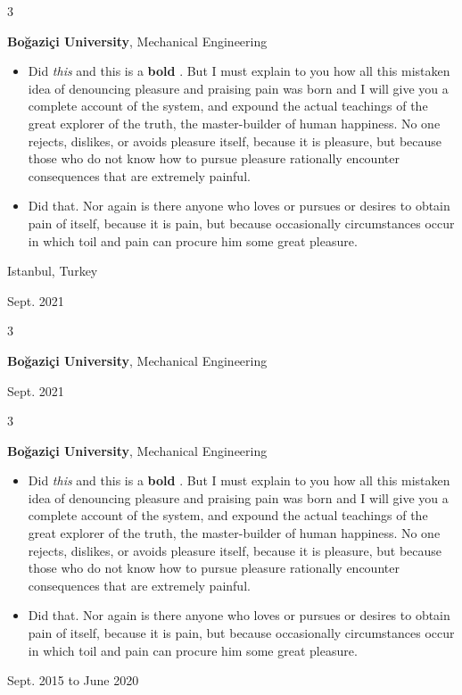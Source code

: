 \documentclass[10pt, letterpaper]{article}
\newenvironment{highlights}{
    \begin{itemize}[
        topsep=0.10 cm,
        parsep=0.10 cm,
        partopsep=0pt,
        itemsep=0pt,
        leftmargin=0.4 cm + 10pt
    ]
}{
    \end{itemize}
} %
\newenvironment{threecolentry}[3][]{
    \onecolentry
    \def\thirdColumn{#3}
    \setcolumnwidth{1 cm, \fill, 4.5 cm}
    \begin{paracol}{3}
    {\raggedright #2} \switchcolumn
}{
    \switchcolumn \raggedleft \thirdColumn
    \end{paracol}
    \endonecolentry
} %
\let\hrefWithoutArrow\href
\renewcommand{\href}[2]{\hrefWithoutArrow{#1}{\mbox{\ifthenelse{\equal{#2}{}}{ }{#2 }\raisebox{.15ex}{\footnotesize \faExternalLink*}}}}
\begin{document}
        \vspace{0.2 cm}

        \begin{threecolentry}{\textbf{}}{
            Istanbul, Turkey

        Sept. 2021
        }
            \textbf{Boğaziçi University}, Mechanical Engineering
            \begin{highlights}
                \item Did \textit{this} and this is a \textbf{bold} \href{https://example.com}{link}. But I must explain to you how all this mistaken idea of denouncing pleasure and praising pain was born and I will give you a complete account of the system, and expound the actual teachings of the great explorer of the truth, the master-builder of human happiness. No one rejects, dislikes, or avoids pleasure itself, because it is pleasure, but because those who do not know how to pursue pleasure rationally encounter consequences that are extremely painful.
                \item Did that. Nor again is there anyone who loves or pursues or desires to obtain pain of itself, because it is pain, but because occasionally circumstances occur in which toil and pain can procure him some great pleasure.
            \end{highlights}
        \end{threecolentry}

        \vspace{0.2 cm}

        \begin{threecolentry}{\textbf{}}{
            Sept. 2021
        }
            \textbf{Boğaziçi University}, Mechanical Engineering
        \end{threecolentry}

        \vspace{0.2 cm}

        \begin{threecolentry}{\textbf{}}{
            Sept. 2015 to June 2020
        }
            \textbf{Boğaziçi University}, Mechanical Engineering
            \begin{highlights}
                \item Did \textit{this} and this is a \textbf{bold} \href{https://example.com}{link}. But I must explain to you how all this mistaken idea of denouncing pleasure and praising pain was born and I will give you a complete account of the system, and expound the actual teachings of the great explorer of the truth, the master-builder of human happiness. No one rejects, dislikes, or avoids pleasure itself, because it is pleasure, but because those who do not know how to pursue pleasure rationally encounter consequences that are extremely painful.
                \item Did that. Nor again is there anyone who loves or pursues or desires to obtain pain of itself, because it is pain, but because occasionally circumstances occur in which toil and pain can procure him some great pleasure.
            \end{highlights}
        \end{threecolentry}
\end{document}
